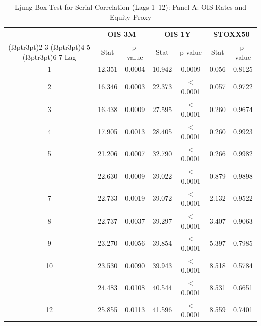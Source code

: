 \begin{table}[!h]
\centering
\caption{Ljung-Box Test for Serial Correlation (Lags 1--12): Panel A: OIS Rates and Equity Proxy}
\centering
\fontsize{9}{11}\selectfont
\begin{tabular}[t]{ccccccc}
\toprule
\multicolumn{1}{c}{ } & \multicolumn{2}{c}{OIS 3M} & \multicolumn{2}{c}{OIS 1Y} & \multicolumn{2}{c}{STOXX50} \\
\cmidrule(l{3pt}r{3pt}){2-3} \cmidrule(l{3pt}r{3pt}){4-5} \cmidrule(l{3pt}r{3pt}){6-7}
Lag & Stat & p-value & Stat & p-value & Stat & p-value\\
\midrule
1 & 12.351 & 0.0004 & 10.942 & 0.0009 & 0.056 & 0.8125\\
2 & 16.346 & 0.0003 & 22.373 & $<$0.0001 & 0.057 & 0.9722\\
3 & 16.438 & 0.0009 & 27.595 & $<$0.0001 & 0.260 & 0.9674\\
4 & 17.905 & 0.0013 & 28.405 & $<$0.0001 & 0.260 & 0.9923\\
5 & 21.206 & 0.0007 & 32.790 & $<$0.0001 & 0.266 & 0.9982\\
\addlinespace
6 & 22.630 & 0.0009 & 39.022 & $<$0.0001 & 0.879 & 0.9898\\
7 & 22.733 & 0.0019 & 39.072 & $<$0.0001 & 2.132 & 0.9522\\
8 & 22.737 & 0.0037 & 39.297 & $<$0.0001 & 3.407 & 0.9063\\
9 & 23.270 & 0.0056 & 39.854 & $<$0.0001 & 5.397 & 0.7985\\
10 & 23.530 & 0.0090 & 39.943 & $<$0.0001 & 8.518 & 0.5784\\
\addlinespace
11 & 24.483 & 0.0108 & 40.544 & $<$0.0001 & 8.531 & 0.6651\\
12 & 25.855 & 0.0113 & 41.596 & $<$0.0001 & 8.559 & 0.7401\\
\bottomrule
\end{tabular}
\end{table}

